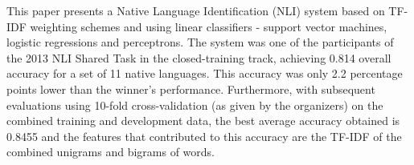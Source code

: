 This paper presents a Native Language Identification (NLI) system based on TF-IDF weighting schemes and using linear classifiers - support vector
 machines, logistic regressions and perceptrons. The system was one of the
 participants of the 2013 NLI Shared Task  in the closed-training track,
 achieving 0.814 overall accuracy for a set of 11 native languages. This
 accuracy was only 2.2 percentage points lower than the winner's performance.
 Furthermore, with subsequent evaluations using 10-fold cross-validation (as
 given by the organizers) on the combined training and development data, the
 best average accuracy obtained is 0.8455 and the features that contributed to
 this accuracy are the TF-IDF of the combined unigrams and bigrams of words.

